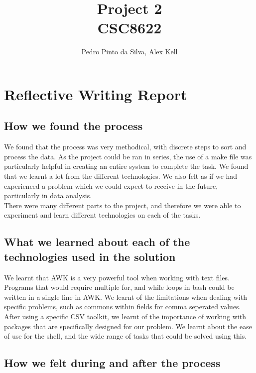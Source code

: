 \documentclass{article}
\begin{document}
\title{Project 2 \\ CSC8622}
\author{Pedro Pinto da Silva, Alex Kell}

\maketitle

\section*{Reflective Writing Report}

\subsection*{How we found the process}

We found that the process was very methodical, with discrete steps to sort and process the data. As the project could be ran in series, the use of a make file was particularly helpful in creating an entire system to complete the task. We found that we learnt a lot from the different technologies. We also felt as if we had experienced a problem which we could expect to receive in the future, particularly in data analysis. \\

There were many different parts to the project, and therefore we were able to experiment and learn different technologies on each of the tasks.

\subsection*{What we learned about each of the technologies used in the solution}

We learnt that AWK is a very powerful tool when working with text files. Programs that would require multiple for, and while loops in bash could be written in a single line in AWK. We learnt of the limitations when dealing with specific problems, such as commons within fields for comma seperated values.  After using a specific CSV toolkit, we learnt of the importance of working with packages that are specifically designed for our problem.  We learnt about the ease of use for the shell, and the wide range of tasks that could be solved using this. 

\subsection*{How we felt during and after the process}
\end{document}
